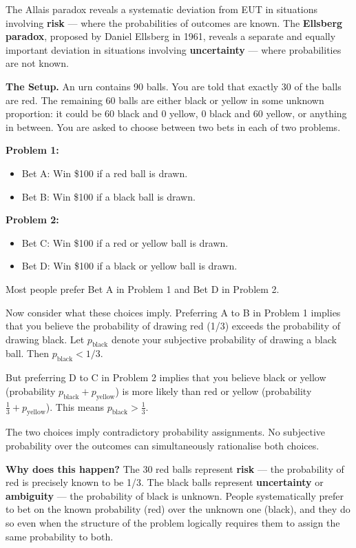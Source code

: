\documentclass[12pt, letterpaper]{article}
\begin{document}
The Allais paradox reveals a systematic deviation from EUT in situations involving \textbf{risk} --- where the probabilities of outcomes are known. The \textbf{Ellsberg paradox}, proposed by Daniel Ellsberg in 1961, reveals a separate and equally important deviation in situations involving \textbf{uncertainty} --- where probabilities are not known.

\textbf{The Setup.} An urn contains 90 balls. You are told that exactly 30 of the balls are red. The remaining 60 balls are either black or yellow in some unknown proportion: it could be 60 black and 0 yellow, 0 black and 60 yellow, or anything in between. You are asked to choose between two bets in each of two problems.

\textbf{Problem 1:}
\begin{itemize}
\item Bet A: Win \$100 if a red ball is drawn.
\item Bet B: Win \$100 if a black ball is drawn.
\end{itemize}

\textbf{Problem 2:}
\begin{itemize}
\item Bet C: Win \$100 if a red or yellow ball is drawn.
\item Bet D: Win \$100 if a black or yellow ball is drawn.
\end{itemize}

Most people prefer Bet A in Problem 1 and Bet D in Problem 2.

Now consider what these choices imply. Preferring A to B in Problem 1 implies that you believe the probability of drawing red (1/3) exceeds the probability of drawing black. Let $p_\text{black}$ denote your subjective probability of drawing a black ball. Then $p_\text{black} < 1/3$.



But preferring D to C in Problem 2 implies that you believe black or yellow (probability $p_{\text{black}} + p_{\text{yellow}}$) is more likely than red or yellow (probability $\frac{1}{3} + p_{\text{yellow}}$). This means $p_{\text{black}} > \frac{1}{3}$.


The two choices imply contradictory probability assignments. No subjective probability over the outcomes can simultaneously rationalise both choices.

\textbf{Why does this happen?} The 30 red balls represent \textbf{risk} --- the probability of red is precisely known to be 1/3. The black balls represent \textbf{uncertainty} or \textbf{ambiguity} --- the probability of black is unknown. People systematically prefer to bet on the known probability (red) over the unknown one (black), and they do so even when the structure of the problem logically requires them to assign the same probability to both.
\end{document}
